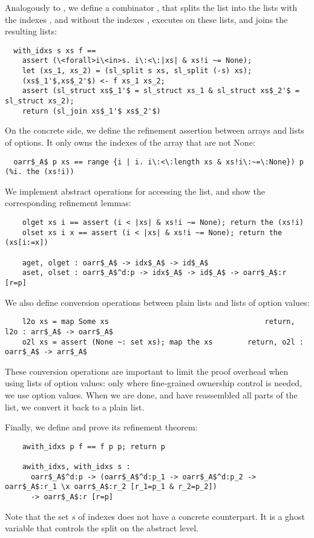 \documentclass[sn-mathphys,Numbered]{sn-jnl}
\theoremstyle{thmstyleone}%
\theoremstyle{definition}%
\theoremstyle{thmstylethree}%
\begin{document}
  Analogously to , we define a combinator , that splits
  the list  into the lists with the indexes , and without the indexes , executes  on these lists,
  and joins the resulting lists:
  \begin{lstlisting}
  with_idxs s xs f ==
    assert (\<forall>i\<in>s. i\:<\:|xs| & xs!i ~= None);
    let (xs_1, xs_2) = (sl_split s xs, sl_split (-s) xs);
    (xs$_1'$,xs$_2'$) <- f xs_1 xs_2;
    assert (sl_struct xs$_1'$ = sl_struct xs_1 & sl_struct xs$_2'$ = sl_struct xs_2);
    return (sl_join xs$_1'$ xs$_2'$)
  \end{lstlisting}

  On the concrete side, we define the refinement assertion  between arrays and lists of options.
  It only owns the indexes of the array that are not None:
  \begin{lstlisting}
  oarr$_A$ p xs == range {i | i. i\:<\:length xs & xs!i\:~=\:None}) p (%i. the (xs!i))
  \end{lstlisting}

  We implement abstract operations for accessing the list, and show the corresponding refinement lemmas:
  \begin{lstlisting}
    olget xs i == assert (i < |xs| & xs!i ~= None); return the (xs!i)
    olset xs i x == assert (i < |xs| & xs!i ~= None); return the (xs[i:=x])

    aget, olget : oarr$_A$ -> idx$_A$ -> id$_A$
    aset, olset : oarr$_A$^d:p -> idx$_A$ -> id$_A$ -> oarr$_A$:r [r=p]
  \end{lstlisting}
  We also define conversion operations between plain lists and lists of option values:
  \begin{lstlisting}
    l2o xs = map Some xs                                    return, l2o : arr$_A$ -> oarr$_A$
    o2l xs = assert (None ~: set xs); map the xs        return, o2l : oarr$_A$ -> arr$_A$
  \end{lstlisting}
  These conversion operations are important to limit the proof overhead when using lists of option
  values: only where fine-grained ownership control is needed, we use option values.
  When we are done, and have reassembled all parts of the list, we convert it back to a plain list.

  Finally, we define  and prove its refinement theorem:
  \begin{lstlisting}
    awith_idxs p f == f p p; return p

    awith_idxs, with_idxs s :
      oarr$_A$^d:p -> (oarr$_A$^d:p_1 -> oarr$_A$^d:p_2 -> oarr$_A$:r_1 \x oarr$_A$:r_2 [r_1=p_1 & r_2=p_2])
      -> oarr$_A$:r [r=p]
  \end{lstlisting}
  Note that the set $s$ of indexes does not have a concrete counterpart.
  It is a ghost variable that controls the split on the abstract level.
\end{document}
